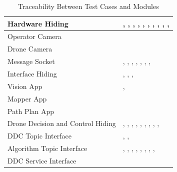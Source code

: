 \documentclass[12pt, titlepage]{article}
\begin{document}
\begin{table}[!h]
\begin{center}
\caption {Traceability Between Test Cases and Modules}
\label{tab:traceTCR_Module}
\begin{tabular}{ | m{5cm} | m{10cm} | }
\hline
Hardware Hiding & \nameref{tab:STCR_001}, \nameref{tab:STCR_002}, \nameref{tab:STCR_003}, \nameref{tab:STCR_004}, \nameref{tab:STCR_005}, \nameref{tab:STCR_006}, \nameref{tab:STCR_007}, \nameref{tab:UTCR_001}, \nameref{tab:UTCR_002}, \nameref{tab:UTCR_003}, \nameref{tab:UTCR_004} \\
\hline
Operator Camera & \nameref{tab:UTCR_005}\\
\hline
Drone Camera &  \nameref{tab:UTCR_006}\\
\hline
Message Socket &  \nameref{tab:STCR_001}, \nameref{tab:STCR_002}, \nameref{tab:STCR_003}, \nameref{tab:STCR_004}, \nameref{tab:STCR_008}, \nameref{tab:STCR_009}, \nameref{tab:STCR_010}, \nameref{tab:UTCR_007}\\
\hline
Interface Hiding &  \nameref{tab:STCR_022}, \nameref{tab:UTCR_008}, \nameref{tab:UTCR_009}, \nameref{tab:UTCR_010}\\
\hline
Vision App &  \nameref{tab:UTCR_011}, \nameref{tab:UTCR_012}\\
\hline
Mapper App &  \nameref{tab:UTCR_013}\\
\hline
Path Plan App & \nameref{tab:UTCR_016} \\
\hline
Drone Decision and Control Hiding &  \nameref{tab:STCR_001}, \nameref{tab:STCR_002}, \nameref{tab:STCR_003}, \nameref{tab:STCR_004}, \nameref{tab:UTCR_014}, \nameref{tab:UTCR_015}, \nameref{tab:UTCR_016}, \nameref{tab:UTCR_017}, \nameref{tab:UTCR_018}, \nameref{tab:UTCR_019} \\
\hline
DDC Topic Interface &  \nameref{tab:STCR_011}, \nameref{tab:STCR_012}, \nameref{tab:UTCR_020}\\
\hline
Algorithm Topic Interface & \nameref{tab:STCR_001}, \nameref{tab:STCR_002}, \nameref{tab:STCR_003}, \nameref{tab:STCR_004}, \nameref{tab:STCR_013}, \nameref{tab:STCR_014}, \nameref{tab:STCR_015}, \nameref{tab:STCR_016}, \nameref{tab:UTCR_021}\\
\hline
DDC Service Interface &  \nameref{tab:UTCR_022}\\
\hline

\end{tabular}
\end{center}
\end{table}		
\end{document}
